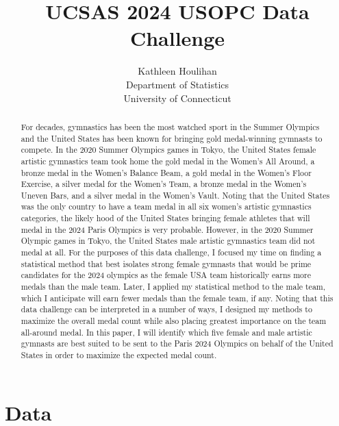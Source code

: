 \documentclass[12pt]{article}
\title{UCSAS 2024 USOPC Data Challenge}
\author{Kathleen Houlihan\\
  Department of Statistics\\
  University of Connecticut
}
\begin{document}
\maketitle

\begin{abstract}
    For decades, gymnastics has been the most watched sport in the Summer Olympics and the United States 
    has been known for bringing gold medal-winning gymnasts to compete. In the 2020 
    Summer Olympics games in Tokyo, the United States female artistic gymnastics team took home 
    the gold medal in the Women's All Around, a bronze medal in the Women's Balance 
    Beam, a gold medal in the Women's Floor Exercise, a silver medal for the Women's
    Team, a bronze medal in the Women's Uneven Bars, and a silver medal in the Women's Vault. 
    Noting that the United States was the only country to have a team medal in all six women's artistic gymnastics 
    categories, the likely hood of the United States bringing female athletes that will medal in the 2024 
    Paris Olympics is very probable. However, in the 2020 Summer Olympic games in Tokyo, the United States 
    male artistic gymnastics team did not medal at all. For the purposes of this data challenge, I focused my 
    time on finding a statistical method that best isolates strong female gymnasts that would be prime candidates 
    for the 2024 olympics as the female USA team historically earns more medals than the male team. Later, I applied 
    my statistical method to the male team, which I anticipate will earn fewer medals than the female team, if any. 
    Noting that this data challenge can be interpreted in a number of ways, I designed my methods to maximize the 
    overall medal count while also placing greatest importance on the team all-around medal. In this paper, I will 
    identify which five female and male artistic gymnasts are best suited to be sent to the Paris 2024 
    Olympics on behalf of the United States in order to maximize the expected medal count. 

\end{abstract}


\section{Data}
\label{sec:data}
\end{document}
